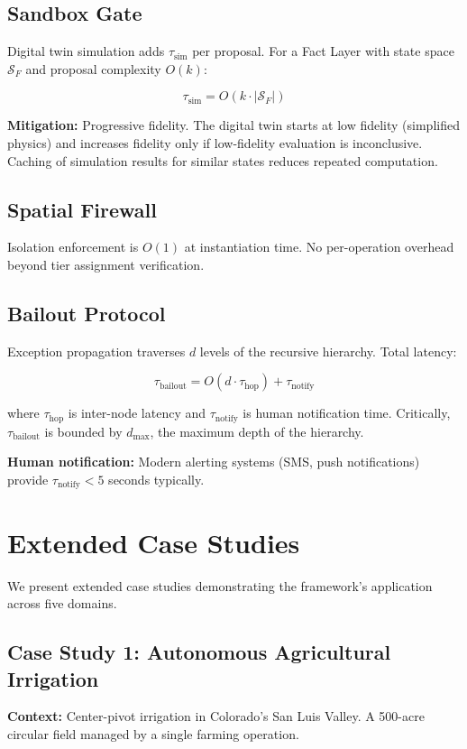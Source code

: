 \documentclass[12pt]{article}
\begin{document}
\subsection{Sandbox Gate}
Digital twin simulation adds $\tau_{\text{sim}}$ per proposal. For a Fact Layer with state space $\mathcal{S}_F$ and proposal complexity $O(k)$:

\begin{equation}
\tau_{\text{sim}} = O(k \cdot |\mathcal{S}_F|)
\end{equation}

\textbf{Mitigation:} Progressive fidelity. The digital twin starts at low fidelity (simplified physics) and increases fidelity only if low-fidelity evaluation is inconclusive. Caching of simulation results for similar states reduces repeated computation.

\subsection{Spatial Firewall}
Isolation enforcement is $O(1)$ at instantiation time. No per-operation overhead beyond tier assignment verification.

\subsection{Bailout Protocol}
Exception propagation traverses $d$ levels of the recursive hierarchy. Total latency:

\begin{equation}
\tau_{\text{bailout}} = O(d \cdot \tau_{\text{hop}}) + \tau_{\text{notify}}
\end{equation}

where $\tau_{\text{hop}}$ is inter-node latency and $\tau_{\text{notify}}$ is human notification time. Critically, $\tau_{\text{bailout}}$ is bounded by $d_{\max}$, the maximum depth of the hierarchy.

\textbf{Human notification:} Modern alerting systems (SMS, push notifications) provide $\tau_{\text{notify}} < 5$ seconds typically.

\section{Extended Case Studies}
\label{sec:casestudies}

We present extended case studies demonstrating the framework's application across five domains.

\subsection{Case Study 1: Autonomous Agricultural Irrigation}
\textbf{Context:} Center-pivot irrigation in Colorado's San Luis Valley. A 500-acre circular field managed by a single farming operation.
\end{document}
